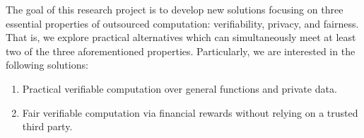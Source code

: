 The goal of this research project is to develop new solutions focusing on three essential properties of outsourced computation: verifiability, privacy, and fairness.
That is, we explore practical alternatives which can simultaneously meet at least two of the three aforementioned properties.
Particularly, we are interested in the following solutions:
\begin{enumerate}
 \item Practical verifiable computation over general functions and private data.
 \item Fair verifiable computation via financial rewards without relying on a trusted third party.
\end{enumerate}